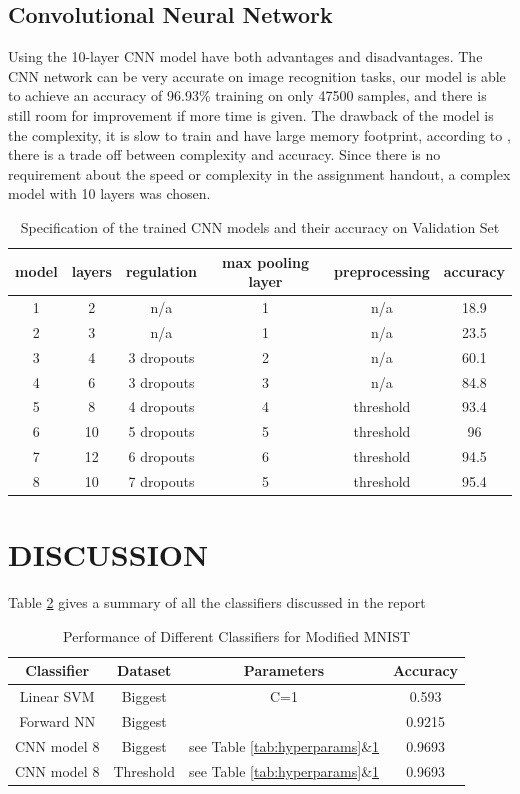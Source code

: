\documentclass[letterpaper, 10 pt, conference]{ieeeconf}  %
\begin{document}
\subsection{Convolutional Neural Network}
Using the 10-layer CNN model have both advantages and disadvantages. The CNN network can be very accurate on image recognition tasks, our model is able to achieve an accuracy of 96.93\% training on only 47500 samples, and there is still room for improvement if more time is given. The drawback of the model is the complexity, it is slow to train and have large memory footprint, according to \cite{dhingra2017model}, there is a trade off between complexity and accuracy. Since there is no requirement about the speed or complexity in the assignment handout, a complex model with 10 layers was chosen. 

\begin{table}
	\centering
	\caption{Specification of the trained CNN models and their accuracy on Validation Set}
	\label{tab:CNNmodels}
	\begin{tabular}{|c|c|c|c|c|c|}
		\hline
		model	&layers&	regulation&	max pooling layer&preprocessing&accuracy\\\hline
		1&	2& n/a & 1   &	n/a		&18.9\\\hline	
		2&	3&	n/a		&1  &	n/a		&23.5\\\hline
		3&	4&	3 dropouts&2&	n/a		&60.1\\\hline
		4&	6&	3 dropouts&3&	n/a		& 84.8	\\\hline
		5&	8&	4 dropouts&4&threshold&93.4	\\\hline
		6&	10&	5 dropouts&5&threshold &96\\\hline
		7&	12&	6 dropouts&6&threshold&94.5\\\hline	
		8&	10&	7 dropouts&5&threshold&95.4\\\hline			
	\end{tabular}
\end{table}

\section{DISCUSSION}
Table \ref{tab:perfAll} gives a summary of all the classifiers discussed in the report
\begin{table}
	\centering
	\caption{Performance of Different Classifiers for Modified MNIST}
	\label{tab:perfAll}
	\begin{tabular}{cccc}
		\hline
		Classifier & Dataset& Parameters & Accuracy\\\hline
		Linear SVM & Biggest &C=1 & 0.593\\
		Forward NN & Biggest & &0.9215\\
		CNN model 8& Biggest & see Table \ref{tab:hyperparams}\&\ref{tab:CNNmodels} &0.9693\\	
		CNN model 8& Threshold & see Table \ref{tab:hyperparams}\&\ref{tab:CNNmodels} &0.9693\\					
	\end{tabular}
\end{table}
\end{document}
